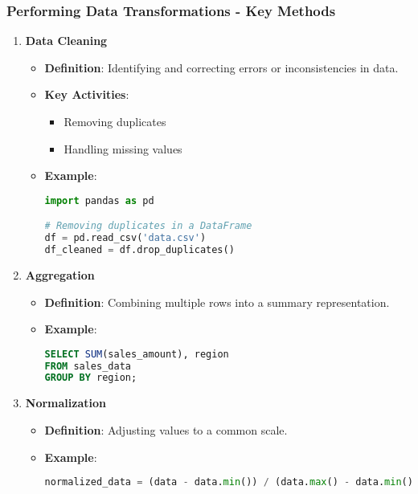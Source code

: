 \documentclass{beamer}
\begin{document}
\begin{frame}[fragile]
    \frametitle{Performing Data Transformations - Key Methods}
    \begin{enumerate}
        \item \textbf{Data Cleaning}
            \begin{itemize}
                \item \textbf{Definition}: Identifying and correcting errors or inconsistencies in data.
                \item \textbf{Key Activities}:
                    \begin{itemize}
                        \item Removing duplicates
                        \item Handling missing values
                    \end{itemize}
                \item \textbf{Example}:
                \begin{lstlisting}[language=Python]
import pandas as pd

# Removing duplicates in a DataFrame
df = pd.read_csv('data.csv')
df_cleaned = df.drop_duplicates()
                \end{lstlisting}
            \end{itemize}

        \item \textbf{Aggregation}
            \begin{itemize}
                \item \textbf{Definition}: Combining multiple rows into a summary representation.
                \item \textbf{Example}:
                \begin{lstlisting}[language=SQL]
SELECT SUM(sales_amount), region
FROM sales_data
GROUP BY region;
                \end{lstlisting}
            \end{itemize}

        \item \textbf{Normalization}
            \begin{itemize}
                \item \textbf{Definition}: Adjusting values to a common scale.
                \item \textbf{Example}:
                \begin{lstlisting}[language=Python]
normalized_data = (data - data.min()) / (data.max() - data.min())
                \end{lstlisting}
            \end{itemize}
    \end{enumerate}
\end{frame}
\end{document}
